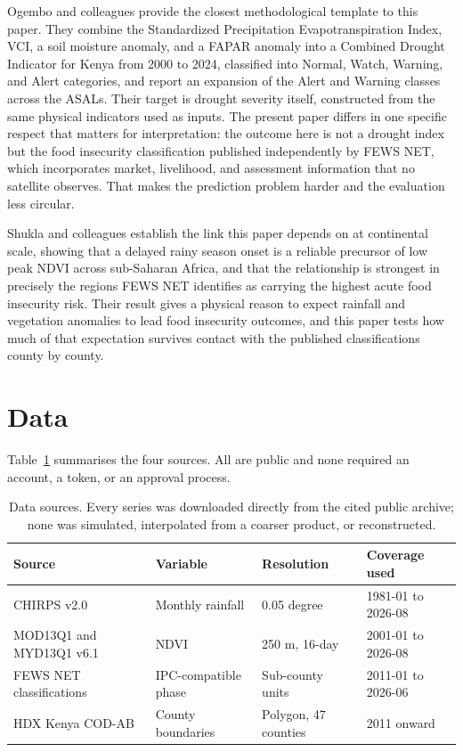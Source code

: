 \documentclass[11pt]{article}
\begin{document}
Ogembo and colleagues \cite{ogembo2026} provide the closest methodological
template to this paper. They combine the Standardized Precipitation
Evapotranspiration Index, VCI, a soil moisture anomaly, and a FAPAR anomaly into
a Combined Drought Indicator for Kenya from 2000 to 2024, classified into
Normal, Watch, Warning, and Alert categories, and report an expansion of the
Alert and Warning classes across the ASALs. Their target is drought severity
itself, constructed from the same physical indicators used as inputs. The
present paper differs in one specific respect that matters for interpretation:
the outcome here is not a drought index but the food insecurity classification
published independently by FEWS NET, which incorporates market, livelihood, and
assessment information that no satellite observes. That makes the prediction
problem harder and the evaluation less circular.

Shukla and colleagues \cite{shukla2021} establish the link this paper depends on
at continental scale, showing that a delayed rainy season onset is a reliable
precursor of low peak NDVI across sub-Saharan Africa, and that the relationship
is strongest in precisely the regions FEWS NET identifies as carrying the
highest acute food insecurity risk. Their result gives a physical reason to
expect rainfall and vegetation anomalies to lead food insecurity outcomes, and
this paper tests how much of that expectation survives contact with the
published classifications county by county.

\section{Data}
\label{sec:data}

Table~\ref{tab:data} summarises the four sources. All are public and none
required an account, a token, or an approval process.

\begin{table}[h]
\centering
\caption{Data sources. Every series was downloaded directly from the cited
public archive; none was simulated, interpolated from a coarser product, or
reconstructed.}
\label{tab:data}
\small
\begin{tabular}{llll}
\toprule
Source & Variable & Resolution & Coverage used \\
\midrule
CHIRPS v2.0 \cite{funk2015} & Monthly rainfall & 0.05 degree & 1981-01 to 2026-08 \\
MOD13Q1 and MYD13Q1 v6.1 & NDVI & 250 m, 16-day & 2001-01 to 2026-08 \\
FEWS NET classifications & IPC-compatible phase & Sub-county units & 2011-01 to 2026-06 \\
HDX Kenya COD-AB & County boundaries & Polygon, 47 counties & 2011 onward \\
\bottomrule
\end{tabular}
\end{table}
\end{document}
